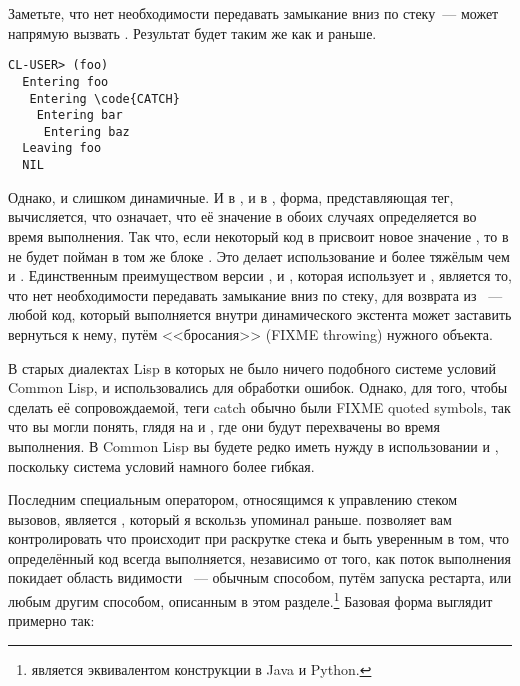 Заметьте, что нет необходимости передавать замыкание вниз по стеку~---  может
напрямую вызвать .  Результат будет таким же как и раньше.

\begin{lstlisting}[style=lisprepl]
  CL-USER> (foo)
  Entering foo
   Entering \code{CATCH}
    Entering bar
     Entering baz
  Leaving foo
  NIL
\end{lstlisting}

Однако,  и  слишком динамичные.  И в , и в
, форма, представляющая тег, вычисляется, что означает, что её значение в
обоих случаях определяется во время выполнения.  Так что, если некоторый код в 
присвоит новое значение , то  в  не будет пойман в том
же блоке .  Это делает использование  и  более тяжёлым
чем  и . Единственным преимуществом версии ,
 и , которая использует  и , является то, что
нет необходимости передавать замыкание вниз по стеку, для возврата из ~---
любой код, который выполняется внутри динамического экстента  может заставить
вернуться к нему, путём <<бросания>> (FIXME throwing) нужного объекта.

В старых диалектах Lisp в которых не было ничего подобного системе условий Common Lisp,
 и  использовались для обработки ошибок.  Однако, для того, чтобы
сделать её сопровождаемой, теги catch обычно были FIXME quoted symbols, так что вы могли
понять, глядя на  и , где они будут перехвачены во время
выполнения. В Common Lisp вы будете редко иметь нужду в использовании  и
, поскольку система условий намного более гибкая.

Последним специальным оператором, относящимся к управлению стеком вызовов, является
, который я вскользь упоминал раньше.  позволяет
вам контролировать что происходит при раскрутке стека и быть уверенным в том, что
определённый код всегда выполняется, независимо от того, как поток выполнения покидает
область видимости ~--- обычным способом, путём запуска рестарта, или
любым другим способом, описанным в этом разделе.\footnote{ является
  эквивалентом конструкции  в Java и Python.}  Базовая форма
 выглядит примерно так:

